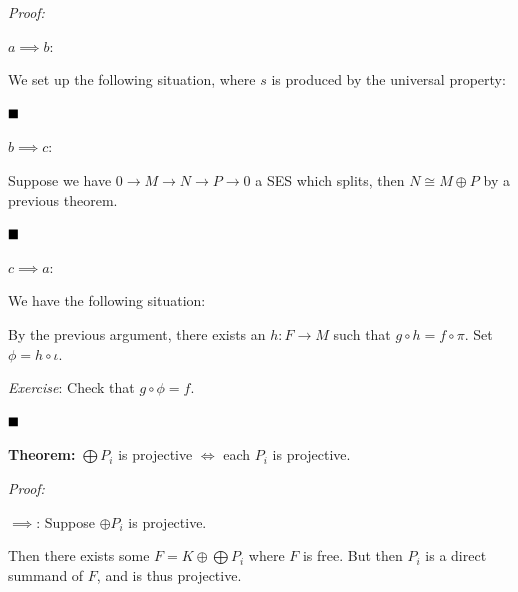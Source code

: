 \emph{Proof:}

\(a \implies b\):

We set up the following situation, where \(s\) is produced by the
universal property:

\begin{center}
\end{center}

\(\qed\)

\(b \implies c\):

Suppose we have \(0 \to M \to N \to P \to 0\) a SES which splits, then
\(N \cong M \oplus P\) by a previous theorem.

\(\qed\)

\(c\implies a\):

We have the following situation:

\begin{center}
\end{center}

By the previous argument, there exists an \(h: F\to M\) such that
\(g\circ h = f \circ \pi\). Set \(\phi = h\circ \iota\).

\emph{Exercise}: Check that \(g\circ \phi = f\).

\(\qed\)

\textbf{Theorem:} \(\bigoplus P_i\) is projective \(\iff\) each \(P_i\)
is projective.

\emph{Proof:}

\(\implies\): Suppose \(\oplus P_i\) is projective.

Then there exists some \(F = K \oplus \bigoplus P_i\) where \(F\) is
free. But then \(P_i\) is a direct summand of \(F\), and is thus
projective.

